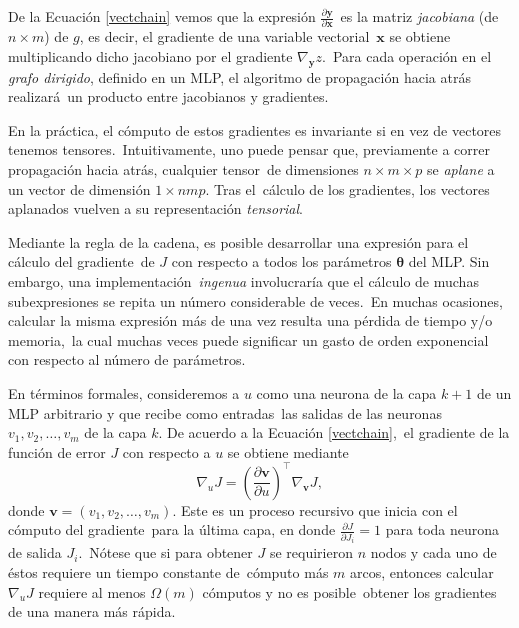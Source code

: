 De la Ecuación \ref{vectchain} vemos que la expresión $\frac{\partial \mathbf{y}}{\partial \mathbf{x}}$\
es la matriz \emph{jacobiana} (de $n \times m$) de $g$, es decir, el gradiente de una variable vectorial\
$\mathbf{x}$ se obtiene multiplicando dicho jacobiano por el gradiente $\nabla_{\mathbf{y}} z$.\
Para cada operación en el \emph{grafo dirigido}, definido en un MLP, el algoritmo de propagación hacia atrás realizará\
un producto entre jacobianos y gradientes.\par
En la práctica, el cómputo de estos gradientes es invariante si en vez de vectores tenemos tensores.\
Intuitivamente, uno puede pensar que, previamente a correr propagación hacia atrás, cualquier tensor\
de dimensiones $n \times m \times p$ se \emph{aplane} a un vector de dimensión $1 \times nmp$. Tras el\
cálculo de los gradientes, los vectores aplanados vuelven a su representación \emph{tensorial}.\par
Mediante la regla de la cadena, es posible desarrollar una expresión para el cálculo del gradiente\
de $J$ con respecto a todos los parámetros $\bm{\theta}$ del MLP. Sin embargo, una implementación\
\emph{ingenua} involucraría que el cálculo de muchas subexpresiones se repita un número considerable de veces.\
En muchas ocasiones, calcular la misma expresión más de una vez resulta una pérdida de tiempo y/o memoria,\
la cual muchas veces puede significar un gasto de orden exponencial con respecto al número de parámetros.\par
En términos formales, consideremos a $u$ como una neurona de la capa $k+1$ de un MLP arbitrario y que recibe como entradas\
las salidas de las neuronas $v_1, v_2, \ldots, v_m$ de la capa $k$. De acuerdo a la Ecuación \ref{vectchain},\
el gradiente de la función de error $J$ con respecto a $u$ se obtiene mediante
\begin{equation}
  \nabla_{u} J =
  \left(\frac{\partial \bm{v}}{\partial u}\right)^\top \nabla_{\bm{v}} J, \label{neurongradient}
\end{equation}
donde $\bm{v} = (v_1, v_2, \ldots, v_m)$. Este es un proceso recursivo que inicia con el cómputo del gradiente\
para la última capa, en donde $\frac{\partial J}{\partial J_i} = 1$ para toda neurona de salida $J_i$.\
Nótese que si para obtener $J$ se requirieron $n$ nodos y cada uno de éstos requiere un tiempo constante de\
cómputo más $m$ arcos, entonces calcular $\nabla_{u} J$ requiere al menos $\Omega(m)$ cómputos y no es posible\
obtener los gradientes de una manera más rápida.\par
